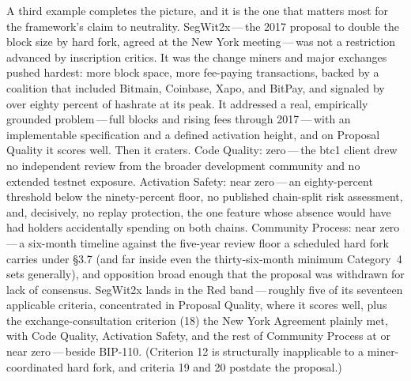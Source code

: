 \documentclass[11pt, twoside, openright]{book}
\newcommand{\sect}[1]{\S#1}
\begin{document}
A third example completes the picture, and it is the one that matters most for the framework's claim to neutrality. SegWit2x\,---\,the 2017 proposal to double the block size by hard fork, agreed at the New York meeting\,---\,was not a restriction advanced by inscription critics. It was the change miners and major exchanges pushed hardest: more block space, more fee-paying transactions, backed by a coalition that included Bitmain, Coinbase, Xapo, and BitPay, and signaled by over eighty percent of hashrate at its peak. It addressed a real, empirically grounded problem\,---\,full blocks and rising fees through 2017\,---\,with an implementable specification and a defined activation height, and on Proposal Quality it scores well. Then it craters. Code Quality: zero\,---\,the btc1 client drew no independent review from the broader development community and no extended testnet exposure. Activation Safety: near zero\,---\,an eighty-percent threshold below the ninety-percent floor, no published chain-split risk assessment, and, decisively, no replay protection, the one feature whose absence would have had holders accidentally spending on both chains. Community Process: near zero\,---\,a six-month timeline against the five-year review floor a scheduled hard fork carries under \sect{3.7} (and far inside even the thirty-six-month minimum Category~4 sets generally), and opposition broad enough that the proposal was withdrawn for lack of consensus. SegWit2x lands in the Red band\,---\,roughly five of its seventeen applicable criteria, concentrated in Proposal Quality, where it scores well, plus the exchange-consultation criterion (18) the New York Agreement plainly met, with Code Quality, Activation Safety, and the rest of Community Process at or near zero\,---\,beside BIP-110. (Criterion 12 is structurally inapplicable to a miner-coordinated hard fork, and criteria 19 and 20 postdate the proposal.)
\end{document}
